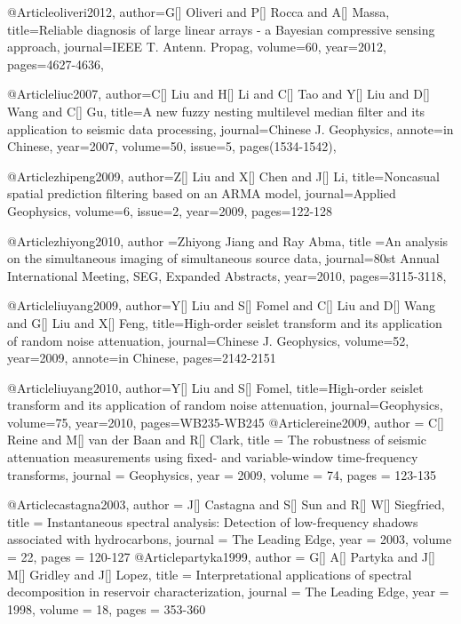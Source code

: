 @Article{oliveri2012,
author={G[] Oliveri and P[] Rocca and A[] Massa},
title={Reliable diagnosis of large linear arrays - a Bayesian compressive sensing approach},
journal={IEEE T. Antenn. Propag},
volume=60,
year=2012,
pages={4627-4636},
}


@Article{liuc2007,
author={C[] Liu and H[] Li and C[] Tao and Y[] Liu and D[] Wang and C[] Gu},
title={A new fuzzy nesting multilevel median filter and its application to seismic data processing},
journal={Chinese J. Geophysics},
annote={in Chinese},
year=2007,
volume=50,
issue=5,
pages(1534-1542),
}

@Article{zhipeng2009,
author={Z[] Liu and X[] Chen and J[] Li},
title={Noncasual spatial prediction filtering based on an ARMA model},
journal={Applied Geophysics},
volume=6,
issue=2,
year=2009,
pages={122-128}
}

@Article{zhiyong2010,
  author ={Zhiyong Jiang and Ray Abma},
  title ={An analysis on the simultaneous imaging of simultaneous source data},
  journal={80st Annual International Meeting, SEG, Expanded Abstracts},
  year=2010,
  pages={3115-3118},
}

@Article{liuyang2009,
author={Y[] Liu and S[] Fomel and C[] Liu and D[] Wang and G[] Liu and X[] Feng},
title={High-order seislet transform and its application of random noise attenuation},
journal={Chinese J. Geophysics},
volume=52,
year=2009,
annote={in Chinese},
pages={2142-2151}
}

@Article{liuyang2010,
author={Y[] Liu and S[] Fomel},
title={High-order seislet transform and its application of random noise attenuation},
journal={Geophysics},
volume=75,
year=2010,
pages={WB235-WB245}
}
@Article{reine2009,
  author = 	 {C[] Reine and M[] van der Baan and R[] Clark},
  title = 	 {The robustness of seismic attenuation measurements using fixed- and variable-window time-frequency transforms},
  journal = 	 {Geophysics},
  year = 	 2009,
  volume = 	 74,
  pages = 	 {123-135}
}


@Article{castagna2003,
  author = 	 {J[] Castagna and S[] Sun and R[] W[] Siegfried},
  title = 	 {Instantaneous spectral analysis: Detection of low-frequency shadows associated with hydrocarbons},
  journal = 	 {The Leading Edge},
  year = 	 2003,
  volume = 	 22,
  pages = 	 {120-127}
}
@Article{partyka1999,
  author = 	 {G[] A[] Partyka and J[] M[] Gridley and J[] Lopez},
  title = 	 {Interpretational applications of spectral decomposition in reservoir characterization},
  journal = 	 {The Leading Edge},
  year = 	 1998,
  volume = 	 18,
  pages = 	 {353-360}
}


